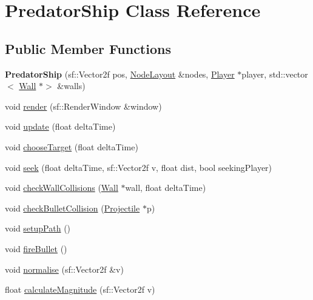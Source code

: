 \hypertarget{class_predator_ship}{}\section{Predator\+Ship Class Reference}
\label{class_predator_ship}
\subsection*{Public Member Functions}
\begin{DoxyCompactItemize}
\item 
\mbox{\label{class_predator_ship_a4af0d2cfa90c67811bc8cd0e3cb26e58}} 
{\bfseries Predator\+Ship} (sf\+::\+Vector2f pos, \mbox{\hyperlink{class_node_layout}{Node\+Layout}} \&nodes, \mbox{\hyperlink{class_player}{Player}} $\ast$player, std\+::vector$<$ \mbox{\hyperlink{class_wall}{Wall}} $\ast$$>$ \&walls)
\item 
void \mbox{\hyperlink{class_predator_ship_abd172d5ef1713de0e79e33ce7b23c13a}{render}} (sf\+::\+Render\+Window \&window)
\item 
void \mbox{\hyperlink{class_predator_ship_aaecc92f60ecbaaaf2f41edbe15a458ea}{update}} (float delta\+Time)
\item 
void \mbox{\hyperlink{class_predator_ship_a5143808a096196286fa4b3c546c183ce}{choose\+Target}} (float delta\+Time)
\item 
void \mbox{\hyperlink{class_predator_ship_a941925b4c228dcbb9fae0d8f9ee8af24}{seek}} (float delta\+Time, sf\+::\+Vector2f v, float dist, bool seeking\+Player)
\item 
void \mbox{\hyperlink{class_predator_ship_aa7763a0a0b525421f672ef3e05c1b9ea}{check\+Wall\+Collisions}} (\mbox{\hyperlink{class_wall}{Wall}} $\ast$wall, float delta\+Time)
\item 
void \mbox{\hyperlink{class_predator_ship_a5b3c56caa2c17fbe78d377c0b4ad5408}{check\+Bullet\+Collision}} (\mbox{\hyperlink{class_projectile}{Projectile}} $\ast$p)
\item 
void \mbox{\hyperlink{class_predator_ship_a68003be2e0126853481903bccb5473ed}{setup\+Path}} ()
\item 
void \mbox{\hyperlink{class_predator_ship_aac64b6592bb9e75c34335f0150a68d12}{fire\+Bullet}} ()
\item 
void \mbox{\hyperlink{class_predator_ship_ad240f08c5f508a3447452d665080cf73}{normalise}} (sf\+::\+Vector2f \&v)
\item 
float \mbox{\hyperlink{class_predator_ship_acaef1f914f1cd32445977927fd4f2d85}{calculate\+Magnitude}} (sf\+::\+Vector2f v)
$$
\end{DoxyCompactItemize}
